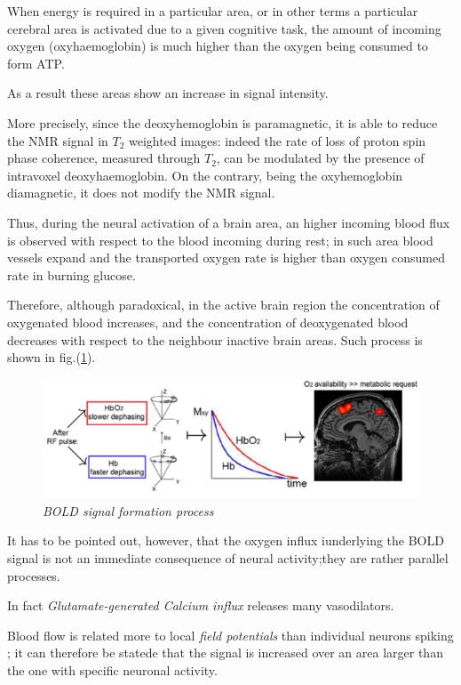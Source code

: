 \documentclass[12pt,openright,twoside,a4paper]{book}
\begin{document}
When energy is required in a particular area, or in other terms a particular cerebral area is activated due to a given cognitive task, the amount of incoming oxygen (oxyhaemoglobin) is much higher than the oxygen being consumed to form ATP. 

As a result these areas show an increase in signal intensity.

More precisely, since the deoxyhemoglobin is paramagnetic, it is able to reduce the NMR signal in $T_2$ weighted images: indeed the rate of loss of proton spin phase coherence, measured through $T_2$, can be modulated by the presence of intravoxel deoxyhaemoglobin. On the contrary, being the oxyhemoglobin diamagnetic, it does not modify the NMR signal.
\vspace{5mm}

Thus, during the neural activation of a brain area, an higher incoming blood flux is observed with respect to the blood incoming during rest; in such area blood vessels expand and the transported oxygen rate is higher than oxygen consumed rate in burning glucose. 

Therefore, although paradoxical, in the active brain region the concentration of oxygenated blood increases, and the concentration of deoxygenated blood decreases with respect to the neighbour inactive brain areas. Such process is shown in fig.(\ref{bold}).

\begin{figure}[!h]
\centering
\includegraphics[scale=0.75]{bold}
\caption{\textit{BOLD signal formation process}}
\label{bold}
\end{figure}

It has to be pointed out, however, that the oxygen influx iunderlying the BOLD signal is not an immediate consequence of neural activity;they are rather parallel processes. 
\vspace{5mm}

In fact \textit{Glutamate-generated Calcium influx} releases many vasodilators. 

Blood flow is related more to local \textit{field potentials} than individual neurons spiking \cite{bold}; it can therefore be statede that the signal is increased over an area larger than the one with specific neuronal activity.
\vspace{5mm}
\end{document}

